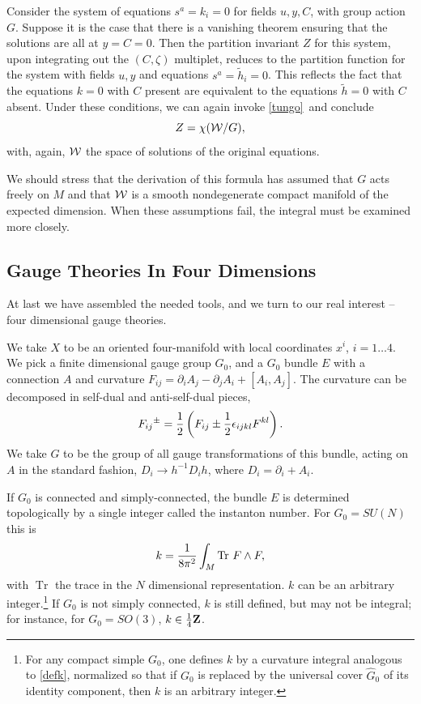 \documentclass[12pt]{article}
\numberwithin{equation}{section}
\def\tilde{\widetilde}
\DeclareMathOperator{\Tr}{Tr}
\begin{document}
Consider the system of equations $s^a=k_i=0$ for fields $u,y,C$, with
group action $G$.
Suppose it is the case that there is a vanishing theorem ensuring
that the solutions are all at $y=C=0$.
Then the partition invariant $Z$ for this system,
upon integrating out the $(C,\zeta)$ multiplet, reduces to the
partition function for the system with fields $u,y$ and equations
$s^a=\tilde h_i=0$.  This reflects the fact that the equations
$k=0$ with $C$ present are equivalent to the equations $\tilde h=0$
with $C$ absent.
Under these conditions, we can again invoke \eqref{tungo}\ and conclude
\begin{equation}
  \label{longo}
  Z=\chi({\cal W}/G),
\end{equation}
with, again, ${\cal W}$ the space of solutions of the original equations.

We should stress that the derivation of this formula has assumed
that $G$ acts freely on $M$ and that ${\cal W}$ is a smooth nondegenerate
compact manifold of the expected dimension.  When these assumptions
fail, the integral must be examined more closely.

\subsection{Gauge Theories In Four Dimensions}

At last we have assembled the needed tools, and we turn to our
real interest -- four dimensional gauge theories.

We take $X$ to be an oriented four-manifold with local coordinates $x^i$,
$i=1\dots 4$.  We
pick a finite dimensional gauge group $G_0$, and a $G_0$ bundle $E$ with
a connection $A$ and curvature $F_{ij}=\partial_iA_j-\partial_jA_i+[A_i,A_j]$.
The curvature can be decomposed in self-dual and anti-self-dual
pieces,
\begin{equation}
  \label{fplus}
  F_{ij}{}^{\pm}={1\over 2}\left(F_{ij}\pm {1\over 2}
  \epsilon_{ijkl}F^{kl}\right) .
\end{equation}
We take $G$ to be the group of all gauge transformations of this bundle,
acting on $A$ in the standard fashion, $D_i\to h^{-1}D_ih$, where
$D_i=\partial_i+A_i$.

If $G_0$ is connected and simply-connected, the bundle $E$ is determined
topologically by a single integer called the instanton number.
For $G_0=SU(N)$ this is
\begin{equation}
  \label{defk}
  k={1\over 8\pi^2}\int_M\Tr\, F\wedge F,
\end{equation}
with $\Tr$ the trace in the $N$ dimensional representation.
$k$ can be an arbitrary integer.\footnote{For any compact simple
  $G_0$, one defines $k$ by a curvature integral analogous to
  \eqref{defk}, normalized so that if $G_0$ is replaced by the
  universal cover $\widehat G_0$ of its identity component, then $k$ is
an arbitrary integer.}  If $G_0$ is not
simply connected, $k$ is still defined, but may not be integral;
for instance, for $G_0=SO(3)$, $k\in {1\over 4}{\bf Z}$.
\end{document}
